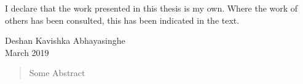 
\cleardoublepage{}
\begin{declaration}
    I declare that the work presented in this thesis is my own.
    Where the work of others has been consulted, this has been indicated in the text.
    \vspace*{1.5cm}
    \begin{flushright}
        Deshan Kavishka Abhayasinghe \\
        March 2019
    \end{flushright}
\end{declaration}

\begin{abstract}
   Some Abstract
\end{abstract}

\cleardoublepage{}\tableofcontents
\cleardoublepage{}\listoffigures
\cleardoublepage{}\listoftables

\dedication{For Paul}
